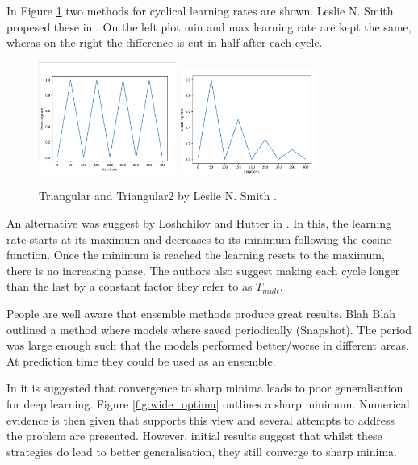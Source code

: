 In Figure \ref{fig:triangular_cyclical_learning_rate} two methods for cyclical learning rates are shown.
Leslie N. Smith propesed these in \cite{Smith_2015}.
On the left plot min and max learning rate are kept the same, wheras on the right the difference is cut in half after each cycle.

\begin{figure}
    \centering
    \includegraphics[width=0.4\textwidth]{./img/triangular.png}
    \includegraphics[width=0.4\textwidth]{./img/triangular2.png}
    \caption{Triangular and Triangular2 by Leslie N. Smith \cite{Smith_2015}.}
    \label{fig:triangular_cyclical_learning_rate}
\end{figure}

An alternative was suggest by Loshchilov and Hutter in \cite{Loshchilov_Hutter_2016}.
In this, the learning rate starts at its maximum and decreases to its minimum following the cosine function.
Once the minimum is reached the learning resets to the maximum, there is no increasing phase.
The authors also suggest making each cycle longer than the last by a constant factor they refer to as $T_{mult}$.


People are well aware that ensemble methods produce great results.
Blah Blah outlined a method where models where saved periodically (Snapshot).
The period was large enough such that the models performed better/worse in different areas.
At prediction time they could be used as an ensemble. \cite{Huang_Li_Pleiss_Liu_Hopcroft_Weinberger_2017}

In \cite{Keskar_Mudigere_Nocedal_Smelyanskiy_Tang_2016} it is suggested that convergence to sharp minima leads to poor generalisation for deep learning.
Figure \ref{fig:wide_optima} outlines a sharp minimum.
Numerical evidence is then given that supports this view and several attempts to address the problem are presented.
However, initial results suggest that whilst these strategies do lead to better generalisation, they still converge to sharp minima.

